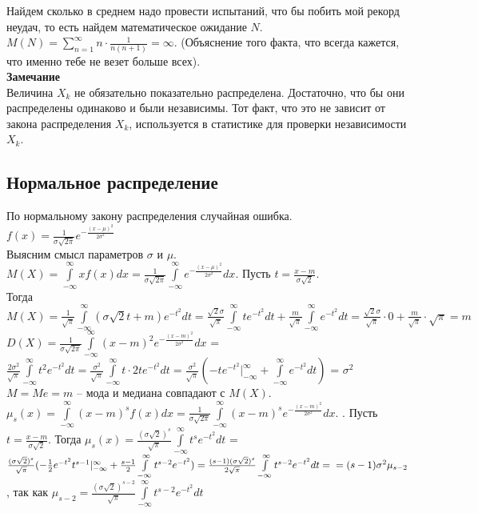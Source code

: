 \documentclass[russian, 12pt, fleqn]{article}
\begin{document}
Найдем сколько в среднем надо провести испытаний, что бы побить мой рекорд неудач, то есть найдем математическое ожидание $N$. $M(N) = \sum\limits_{n=1}^{\infty} n\cdot  \frac{1}{n(n+1)} = \infty$. (Объяснение того факта, что всегда кажется, что именно тебе не везет больше всех).\\
\textbf{Замечание\ } \\
Величина $X_k$ не обязательно показательно распределена. Достаточно, что бы они распределены одинаково и были независимы. Тот факт, что это не зависит от закона распределения $X_k$, используется в статистике для проверки независимости $X_k$.\\
\subsection{Нормальное распределение}
По нормальному закону распределения случайная ошибка.\\
$f(x) = \frac{1}{\sigma \sqrt{2\pi}}e^{-\frac{(x-\mu)^2}{2\sigma^2}}$\\
Выясним смысл параметров $\sigma$ и $\mu$.\\
$M(X) = \int\limits_{-\infty}^{\infty}   xf(x)dx = \frac{1}{\sigma \sqrt{2\pi} } \int\limits_{-\infty}^{\infty}e^{-\frac{(x-\mu)^2}{2\sigma^2}}dx$. Пусть $t = \frac{x - m}{\sigma\sqrt{2}}$.\\
Тогда $M(X)  = \frac{1}{\sqrt{\pi}}\int\limits_{-\infty}^{\infty}(\sigma \sqrt{2}t+m)e^{-t^2}dt = \frac{\sqrt{2}\sigma}{\sqrt{\pi}}\int\limits_{-\infty}^{\infty} te^{-t^2}dt + \frac{m}{\sqrt{\pi}} \int\limits_{-\infty}^{\infty} e^{-t^2}dt =  \frac{\sqrt{2}\sigma}{\sqrt{\pi}} \cdot 0 + \frac{m}{\sqrt{\pi}} \cdot \sqrt{\pi} = m$\\
$D(X) = \frac{1}{\sigma \sqrt{2\pi}} \int\limits_{-\infty}^{\infty} (x-m)^2 e^{-\frac{(x-m)^2}{2\sigma^2}} dx$ = $\frac{2\sigma^2}{\sqrt{\pi}} \int\limits_{-\infty}^{\infty} t^2 e^{-t^2} dt = 
 \frac{\sigma^2}{\sqrt{\pi}} \int\limits_{-\infty}^{\infty} t\cdot2te^{-t^2}dt = \frac{\sigma^2}{\sqrt{\pi}} (-te^{-t^2}|_{-\infty}^{\infty} + \int\limits_{-\infty}^{\infty}e^{-t^2}dt)$ = $\sigma^2$\\
$M=Me=m $ -- мода и медиана совпадают с $M(X)$.\\
$\mu_s(x) = \int\limits_{-\infty}^{\infty} (x-m)^s f(x)dx = \frac{1}{\sigma\sqrt{2\pi}} \int\limits_{-\infty}^{\infty} (x-m)^s e^{-\frac{(x-m)^2}{2\sigma^2}}dx. $ . Пусть $t = \frac{x - m}{\sigma\sqrt{2}}$.
Тогда $\mu_s(x) = \frac{(\sigma \sqrt{2})^s}{\sqrt{\pi}}  \int\limits_{-\infty}^{\infty} t^s e^{-t^2} dt$  = $\frac{(\sigma \sqrt{2})^s}{\sqrt{\pi}} (-\frac{1}{2}e^{-t^2}t^{s-1}|_{-\infty}^{\infty}+ \frac{s-1}{2}\int\limits_{-\infty}^{\infty}t^{s-2}e^{-t^2}) = \frac{(s-1)(\sigma\sqrt{2})^s}{2\sqrt{\pi}} \int\limits_{-\infty}^{\infty} t^{s-2}e^{-t^2}dt =\\= (s-1)\sigma^2\mu_{s-2}$, так как $\mu_{s-2}  = \frac{(\sigma\sqrt{2})^{s-2}}{\sqrt{\pi}} \int\limits_{-\infty}^{\infty}t ^{s-2} e^{-t^2}dt$\\
\end{document}
